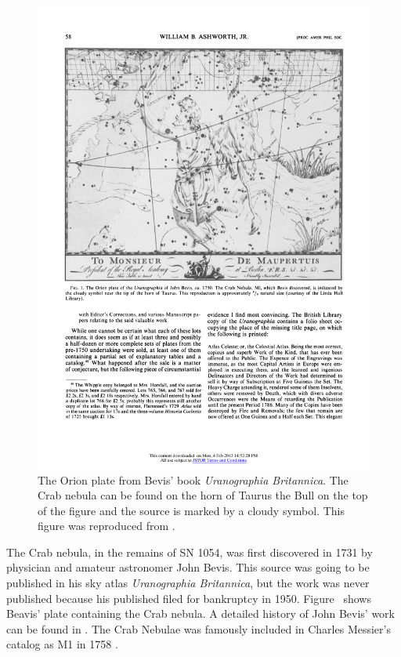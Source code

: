 \begin{figure}[htbp]
  \centering
  \includegraphics[width=\textwidth]{chapters/introduction/figures/bevis_crab.pdf}
  \caption{The Orion plate from Bevis' book {\em Uranographia Britannica}.
  The Crab nebula can be found on the horn of Taurus the Bull 
  on the top of the figure and the source is marked by a 
  cloudy symbol.
  This figure was reproduced from \cite{ashworth_1981_bevis-uranographia}.}
\end{figure}

The Crab nebula, in the remains of SN 1054,
was first discovered in 1731 by physician and amateur astronomer
John Bevis.  This source was going to be published in his sky atlas
{\em Uranographia Britannica}, but the work was never published because
his published filed for bankruptcy in 1950.  Figure~
shows Beavis' plate containing the Crab nebula.  A detailed history of
John Bevis' work can be found in \cite{ashworth_1981_bevis-uranographia}.
The Crab Nebulae was famously included in Charles Messier's catalog as
M1 in 1758 \cite{hester_2008_nebula:-astrophysical}.

